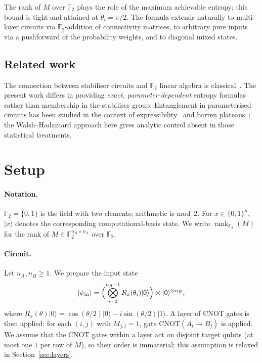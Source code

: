 \documentclass[11pt,a4paper]{article}
\newcommand{\F}{\mathbb{F}}
\newcommand{\rk}{\operatorname{rank}_{\F_2}}
\begin{document}
The rank of $M$ over $\F_2$ plays the role of the maximum achievable entropy;
this bound is tight and attained at $\theta_i = \pi/2$.  The formula
extends naturally to multi-layer circuits via $\F_2$-addition of connectivity
matrices, to arbitrary pure inputs via a pushforward of the probability
weights, and to diagonal mixed states.

\subsection*{Related work}

The connection between stabiliser circuits and $\F_2$ linear algebra is
classical~\cite{gottesman1997stabilizer}.  The present work differs in
providing \emph{exact, parameter-dependent} entropy formulas rather than
membership in the stabiliser group.  Entanglement in parameterised circuits
has been studied in the context of expressibility~\cite{sim2019expressibility}
and barren plateaus~\cite{mcclean2018barren}; the Walsh–Hadamard approach
here gives analytic control absent in those statistical treatments.

\section{Setup}
\label{sec:prelim}

\paragraph{Notation.}
$\F_2 = \{0,1\}$ is the field with two elements; arithmetic is mod~2.
For $x \in \{0,1\}^n$, $|x\rangle$ denotes the corresponding
computational-basis state.  We write $\rk(M)$ for the rank of
$M \in \F_2^{n_B \times n_A}$ over $\F_2$.

\paragraph{Circuit.}
Let $n_A, n_B \geq 1$.  We prepare the input state
\begin{equation}
  |\psi_{\mathrm{in}}\rangle
  = \Bigl(\bigotimes_{i=0}^{n_A-1} R_x(\theta_i)|0\rangle\Bigr)
    \otimes |0\rangle^{\otimes n_B},
  \label{eq:input}
\end{equation}
where $R_x(\theta)|0\rangle = \cos(\theta/2)|0\rangle - i\sin(\theta/2)|1\rangle$.
A layer of CNOT gates is then applied: for each $(i,j)$ with $M_{j,i}=1$,
gate $\mathrm{CNOT}(A_i \to B_j)$ is applied.  We assume that the CNOT
gates within a layer act on disjoint target qubits (at most one $1$ per row
of $M$), so their order is immaterial; this assumption is relaxed in
Section~\ref{sec:layers}.
\end{document}
